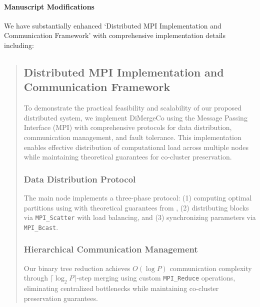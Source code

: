 \documentclass{ar2rc}
\theoremstyle{definition}
\theoremstyle{remark} %
\begin{document}
\paragraph{Manuscript Modifications}

We have substantially enhanced  `Distributed MPI Implementation and Communication Framework' with comprehensive implementation details including:

\begin{quote}
  \subsection*{ Distributed MPI Implementation and Communication Framework}
  To demonstrate the practical feasibility and scalability of our proposed distributed system, we implement DiMergeCo using the Message Passing Interface (MPI) with comprehensive protocols for data distribution, communication management, and fault tolerance. This implementation enables effective distribution of computational load across multiple nodes while maintaining theoretical guarantees for co-cluster preservation.
  \subsubsection*{ Data Distribution Protocol}
  The main node implements a three-phase protocol: (1) computing optimal partitions using  with theoretical guarantees from , (2) distributing blocks via \texttt{MPI\_Scatter} with load balancing, and (3) synchronizing parameters via \texttt{MPI\_Bcast}.

  \subsubsection*{ Hierarchical Communication Management}
  Our binary tree reduction achieves $O(\log P)$ communication complexity through $\lceil \log_2 P \rceil$-step merging using custom \texttt{MPI\_Reduce} operations, eliminating centralized bottlenecks while maintaining co-cluster preservation guarantees.
\end{quote}

\end{document}
